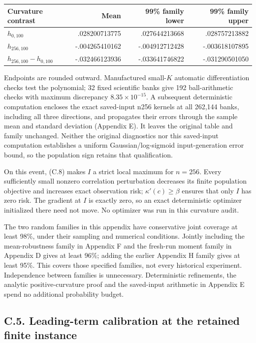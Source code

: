 \documentclass{article}
\begin{document}
\begin{longtable}[]{@{}lrrr@{}}
\toprule\noalign{}
Curvature contrast & Mean & 99\% family lower & 99\% family upper \\
\midrule\noalign{}
\endhead
\bottomrule\noalign{}
\endlastfoot
\(h_{0,100}\) & .028200713775 & .027644213668 & .028757213882 \\
\(h_{256,100}\) & -.004265410162 & -.004912712428 & -.003618107895 \\
\(h_{256,100}-h_{0,100}\) & -.032466123936 & -.033641746822 &
-.031290501050 \\
\end{longtable}

Endpoints are rounded outward. Manufactured small-\(K\) automatic
differentiation checks test the polynomial; 32 fixed scientific banks
give 192 ball-arithmetic checks with maximum discrepancy
\(8.35\times10^{-15}\). A subsequent deterministic computation encloses
the exact saved-input n256 kernels at all 262,144 banks, including all
three directions, and propagates their errors through the sample mean
and standard deviation (Appendix E). It leaves the original table and
family unchanged. Neither the original diagnostics nor this saved-input
computation establishes a uniform Gaussian/log-sigmoid input-generation
error bound, so the population sign retains that qualification.

On this event, (C.8) makes \(I\) a strict local maximum for \(n=256\).
Every sufficiently small nonzero correlation perturbation decreases its
finite population objective and increases exact observation risk;
\(\kappa'(c)\ge\beta\) ensures that only \(I\) has zero risk. The
gradient at \(I\) is exactly zero, so an exact deterministic optimizer
initialized there need not move. No optimizer was run in this curvature
audit.

The two random families in this appendix have conservative joint
coverage at least 98\%, under their sampling and numerical conditions.
Jointly including the mean-robustness family in Appendix F and the
fresh-run moment family in Appendix D gives at least 96\%; adding the
earlier Appendix H family gives at least 95\%. This covers those
specified families, not every historical experiment. Independence
between families is unnecessary. Deterministic refinements, the analytic
positive-curvature proof and the saved-input arithmetic in Appendix E
spend no additional probability budget.

\subsection*{C.5. Leading-term calibration at the retained finite
instance}\label{c.5.-leading-term-calibration-at-the-retained-finite-instance}
\end{document}
